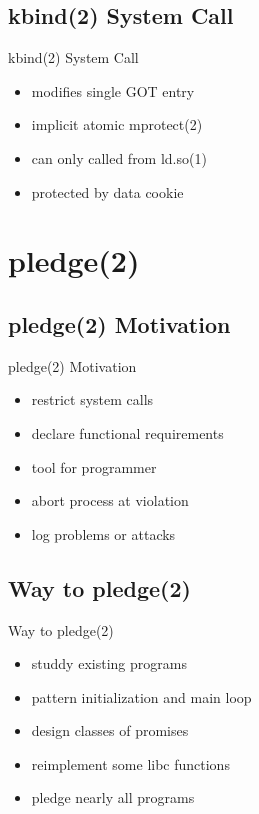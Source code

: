 \documentclass[14pt]{beamer}
\begin{document}
\subsection{kbind(2) System Call}
\begin{frame}{kbind(2) System Call}
\begin{itemize}
    \item modifies single GOT entry
    \item implicit atomic mprotect(2)
    \item can only called from ld.so(1)
    \item protected by data cookie
\end{itemize}
\end{frame}

\section{pledge(2)}

\subsection{pledge(2) Motivation}
\begin{frame}{pledge(2) Motivation}
\begin{itemize}
    \item restrict system calls
    \item declare functional requirements
    \item tool for programmer
    \item abort process at violation
    \item log problems or attacks
\end{itemize}
\end{frame}

\subsection{Way to pledge(2)}
\begin{frame}{Way to pledge(2)}
\begin{itemize}
    \item studdy existing programs
    \item pattern initialization and main loop
    \item design classes of promises
    \item reimplement some libc functions
    \item pledge nearly all programs
\end{itemize}
\end{frame}
\end{document}
